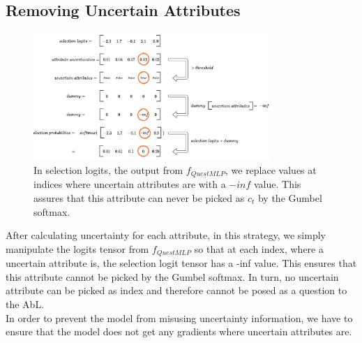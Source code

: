 \documentclass[a4paper,cleardoubleempty,BCOR1cm, 11pt]{report}
\begin{document}
\subsection{Removing Uncertain Attributes}\label{sec:remRDTC}
\begin{figure}
	\centering
	\includegraphics[width=0.8\textwidth]{images/remove_attrs.pdf} 
	\caption{In selection logits, the output from $f_{QuestMLP}$, we replace values at indices where uncertain attributes are with a $-inf$ value. This assures that this attribute can never be picked as $c_t$ by the Gumbel softmax.}
	\label{fig:remove_intuition}
\end{figure}

After calculating uncertainty for each attribute, in this strategy, we simply manipulate the logits tensor from $f_{QuestMLP}$ so that at each index, where a uncertain attribute is, the selection logit tensor has a -inf value. This ensures that this attribute cannot be picked by the Gumbel softmax. In turn, no uncertain attribute can be picked as index and therefore cannot be posed as a question to the AbL.\\
In order to prevent the model from misusing uncertainty information, we have to ensure that the model does not get any gradients where uncertain attributes are.
\end{document}
